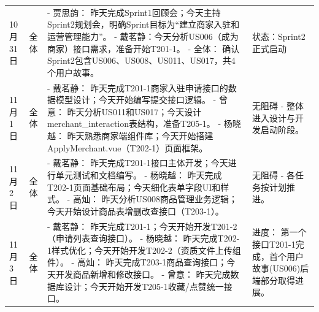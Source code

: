 \begin{levellist}
\begin{longtable}{>{\centering\arraybackslash}m{1cm} >{\centering\arraybackslash}m{1cm} >{\centering\arraybackslash}m{9cm} >{\centering\arraybackslash}m{2.5cm}}
        10月31日                                                  & 全体                                                     & - 贾思韵： 昨天完成Sprint1回顾会；今天主持Sprint2规划会，明确Sprint目标为“建立商家入驻和运营管理能力”。 \newline
        - 戴茗静：今天分析US006（成为商家）接口需求，准备开始T201-1。 \newline
        - 全体： 确认Sprint2包含US006、US008、US011、US017，共4个用户故事。       & 状态：Sprint2正式启动                                                                                                                                      \\
        11月1日                                                   & 全体                                                     & - 戴茗静： 昨天完成T201-1商家入驻申请接口的数据模型设计；今天开始编写提交接口逻辑。 \newline
        - 曾意： 昨天分析US011和US017；今天设计merchant\_interaction表结构，准备T205-1。 \newline
        - 杨晓越： 昨天熟悉商家端组件库；今天开始搭建ApplyMerchant.vue（T202-1）页面框架。  & 无阻碍 - 整体进入设计与开发启动阶段。                                                                                                                                \\
        11月2日                                                   & 全体                                                     & - 戴茗静： 昨天完成T201-1接口主体开发；今天进行单元测试和文档编写。 \newline
        - 杨晓越： 昨天完成T202-1页面基础布局；今天细化表单字段UI和样式。 \newline
        - 高灿： 昨天分析US008商品管理业务逻辑；今天开始设计商品表增删改查接口（T203-1）。        & 无阻碍 - 各任务按计划推进。                                                                                                                                     \\
        11月3日                                                   & 全体                                                     & - 戴茗静： 昨天完成T201-1；今天开始开发T201-2（申请列表查询接口）。 \newline
        - 杨晓越： 昨天完成T202-1样式优化；今天开始开发T202-2（资质文件上传组件）。\newline
        - 高灿： 昨天完成T203-1商品查询接口；今天开发商品新增和修改接口。 \newline
        - 曾意： 昨天完成数据库设计；今天开始开发T205-1收藏/点赞统一接口。                  & 进度： 第一个接口T201-1完成，首个用户故事(US006)后端部分取得进展。                                                                                                            \\

\end{longtable}
\end{levellist}

